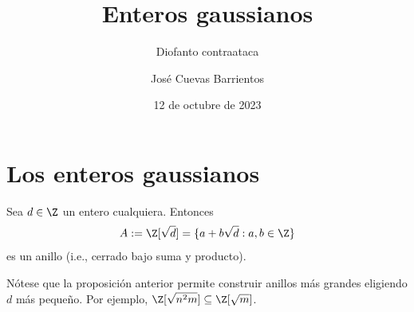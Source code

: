 \documentclass[11pt, reqno]{amsart}
\title{Enteros gaussianos}
\subtitle{Diofanto contraataca}
\date{12 de octubre de 2023}
\author[José Cuevas]{José Cuevas Barrientos}
\begin{document}
\maketitle

\section{Los enteros gaussianos}
\begin{lem}
	Sea $d \in \Z$ un entero cualquiera.
	Entonces
	\[
		A := \Z[\sqrt{d}] = \{ a + b\sqrt{d} : a, b \in \Z \}
	\]
	es un anillo (i.e., cerrado bajo suma y producto).
\end{lem}
Nótese que la proposición anterior permite construir anillos más grandes eligiendo $d$ más pequeño.
Por ejemplo, $\Z[ \sqrt{n^2 m} ] \subseteq \Z[ \sqrt{m} ]$.
\end{document}
